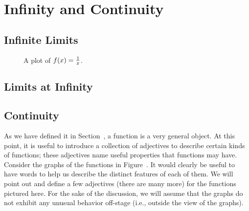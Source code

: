 \chapter{Infinity and Continuity}

\section{Infinite Limits}


\begin{figure}
\caption{A plot of $f(x)=\protect\frac{1}{x}$.}
\label{plot:1/x}
\end{figure}



\section{Limits at Infinity}

\section{Continuity}

As we have defined it in Section~, a function is
a very general object.  At this point, it is useful to introduce a
collection of adjectives to describe certain kinds of functions; these
adjectives name useful properties that functions may have.  Consider
the graphs of the functions in Figure~.  It
would clearly be useful to have words to help us describe the distinct
features of each of them.  We will point out and define a few
adjectives (there are many more) for the functions pictured here.  For
the sake of the discussion, we will assume that the graphs do not
exhibit any unusual behavior off-stage (i.e., outside the view of the
graphs).



